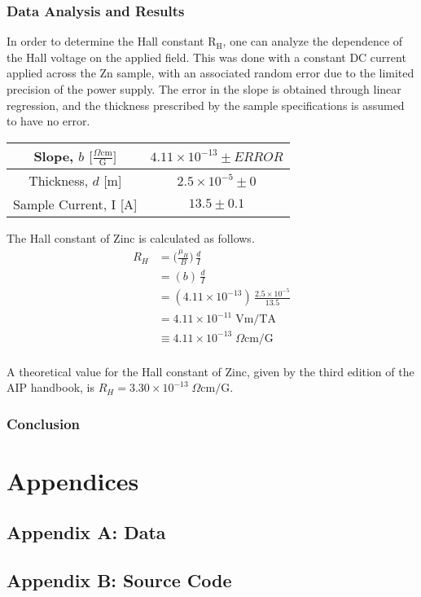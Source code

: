 \documentclass[a4paper]{article}
\begin{document}
\subsubsection{Data Analysis and Results}
In order to determine the Hall constant $\text{R}_\text{H}$, one can analyze the dependence of the Hall voltage on the applied field. This was done with a constant DC current applied across the Zn sample, with an associated random error due to the limited precision of the power supply. The error in the slope is obtained through linear regression, and the thickness prescribed by the sample specifications is assumed to have no error.

\begin{center}
\begin{tabular}{|c|c|}
\hline
Slope, $b$ $\big[  \frac{\Omega \text{cm}}{\text{G}} \big] $ & $4.11 \times 10^{-13} \pm ERROR$ \topVspace \bottomVspace \\
\hline
Thickness, $d$ [m] & $2.5 \times 10^{-5} \pm 0$ \topVspace \bottomVspace \\
\hline
Sample Current, I [A] & $13.5 \pm 0.1$ \topVspace \bottomVspace \\
\hline
\end{tabular}
\label{table:zinc_RH}
\end{center}

The Hall constant of Zinc is calculated as follows.
\begin{align*}
R_H &= \big( \frac{\mu_H}{B} \big) \, \frac{d}{I} \\
    &= (b) \, \frac{d}{I} \\
    &= (4.11 \times 10^{-13}) \, \frac{2.5 \times 10^{-5}}{13.5} \\
    &= 4.11 \times 10^{-11} \; \text{Vm/TA} \\
    &\equiv 4.11 \times 10^{-13} \; \Omega \text{cm/G} \\
\end{align*}

A theoretical value for the Hall constant of Zinc, given by the third edition of the AIP handbook, is $R_H = 3.30 \times 10^{-13} \; \Omega \text{cm/G}$.




\subsubsection{Conclusion}

\section{Appendices}

\subsection{Appendix A: Data}

\subsection{Appendix B: Source Code}
\end{document}
